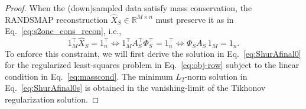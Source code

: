 \documentclass{article}
\begin{document}
\begin{proof}
When the (down)sampled data satisfy mass conservation, the RANDSMAP reconstruction $\widehat{X}_S \in \mathbb{R}^{M \times n}$ must preserve it as in Eq.~\eqref{eq:s2one_cons_recon}, i.e., 
\begin{equation}
1_M^\top \widehat{X}_S = 1_n^\top \Leftrightarrow 1_M^\top A_S^\top \Phi_S^\top  = 1_n^\top \Leftrightarrow \Phi_S A_S\,1_M = 1_n.%
\label{eq:masscond}
\end{equation}
To enforce this constraint, we will first derive the solution in Eq.~\eqref{eq:ShurAfinal0} for the regularized least‑squares problem in Eq.~\eqref{eq:obj-row} subject to the linear condition in Eq.~\eqref{eq:masscond}. The minimum $L_2$-norm solution in Eq.~\eqref{eq:ShurAfinal0s} is obtained in the vanishing-limit of the Tikhonov regularization solution.


\end{proof}
\end{document}
